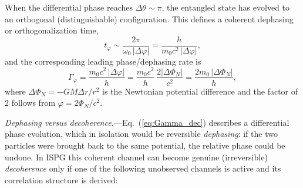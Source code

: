 \documentclass[aps,prd,onecolumn,superscriptaddress,nofootinbib,showpacs,12pt,notitlepage]{revtex4-2}
\begin{document}
When the differential phase reaches $\Delta\theta \sim \pi$,
the entangled state has evolved to an orthogonal (distinguishable)
configuration.  This defines a coherent dephasing or
orthogonalization time,
\begin{equation}\label{eq:t_dec}
  t_{\varphi} \sim \frac{2\pi}{\omega_0\,|\Delta\varphi|}
  = \frac{h}{m_0 c^{2}\,|\Delta\varphi|},
\end{equation}
and the corresponding leading phase/dephasing rate is
\begin{equation}\label{eq:Gamma_dec}
  \boxed{
  \Gamma_{\varphi}
  = \frac{m_0 c^{2}\,|\Delta\varphi|}{h}
  = \frac{m_0 c^{2}}{h}\,\frac{2|\Delta\Phi_N|}{c^{2}}
  = \frac{2m_0\,|\Delta\Phi_N|}{h},
  }
\end{equation}
where $\Delta\Phi_N = -GM\Delta r/r^2$ is the
Newtonian potential difference and the factor of $2$
follows from $\varphi = 2\Phi_N/c^2$.

\textit{Dephasing versus decoherence.}---Eq.~(\ref{eq:Gamma_dec})
describes a differential phase evolution, which in isolation
would be reversible \emph{dephasing}: if the two particles
were brought back to the same potential, the relative phase
could be undone.  In ISPG this coherent channel can become
genuine (irreversible) \emph{decoherence} only if one of the
following unobserved channels is active and its correlation
structure is derived:
\end{document}
